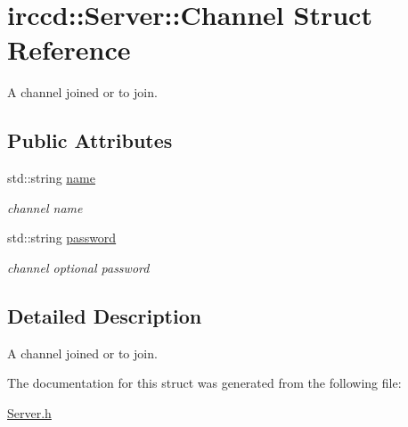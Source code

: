 \hypertarget{a00004}{\section{irccd\-:\-:Server\-:\-:Channel Struct Reference}
\label{a00004}
}


A channel joined or to join.  


\subsection*{Public Attributes}
\begin{DoxyCompactItemize}
\item 
\hypertarget{a00004_ad23ad34475cd916fb6c43a7f59fb307e}{std\-::string \hyperlink{a00004_ad23ad34475cd916fb6c43a7f59fb307e}{name}}\label{a00004_ad23ad34475cd916fb6c43a7f59fb307e}

\begin{DoxyCompactList}\small\item\em channel name \end{DoxyCompactList}\item 
\hypertarget{a00004_ad013d76c6beb501a88793235f00af039}{std\-::string \hyperlink{a00004_ad013d76c6beb501a88793235f00af039}{password}}\label{a00004_ad013d76c6beb501a88793235f00af039}

\begin{DoxyCompactList}\small\item\em channel optional password \end{DoxyCompactList}\end{DoxyCompactItemize}


\subsection{Detailed Description}
A channel joined or to join. 

The documentation for this struct was generated from the following file\-:\begin{DoxyCompactItemize}
\item 
\hyperlink{a00125}{Server.\-h}\end{DoxyCompactItemize}

